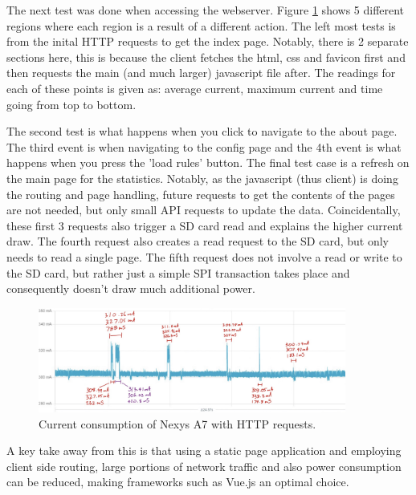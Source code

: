 The next test was done when accessing the webserver. Figure \ref{fig:ppk_http_annotated} shows 5 different regions where each region is a result of a different action. The left most tests is from the inital HTTP requests to get the index page. Notably, there is 2 separate sections here, this is because the client fetches the html, css and favicon first and then requests the main (and much larger) javascript file after. The readings for each of these points is given as: average current, maximum current and time going from top to bottom. 

The second test is what happens when you click to navigate to the about page. The third event is when navigating to the config page and the 4th event is what happens when you press the 'load rules' button. The final test case is a refresh on the main page for the statistics. Notably, as the javascript (thus client) is doing the routing and page handling, future requests to get the contents of the pages are not needed, but only small API requests to update the data. Coincidentally, these first 3 requests also trigger a SD card read and explains the higher current draw. The fourth request also creates a read request to the SD card, but only needs to read a single page. The fifth request does not involve a read or write to the SD card, but rather just a simple SPI transaction takes place and consequently doesn't draw much additional power. 

\begin{figure}[h]
    \centering
    \includegraphics[width=0.9\textwidth]{Images/PPK_http_annotated.png}
    \caption[Current consumption of Nexys A7 with HTTP requests]{Current consumption of Nexys A7 with HTTP requests.}
    \label{fig:ppk_http_annotated}
\end{figure}

A key take away from this is that using a static page application and employing client side routing, large portions of network traffic and also power consumption can be reduced, making frameworks such as Vue.js an optimal choice.
